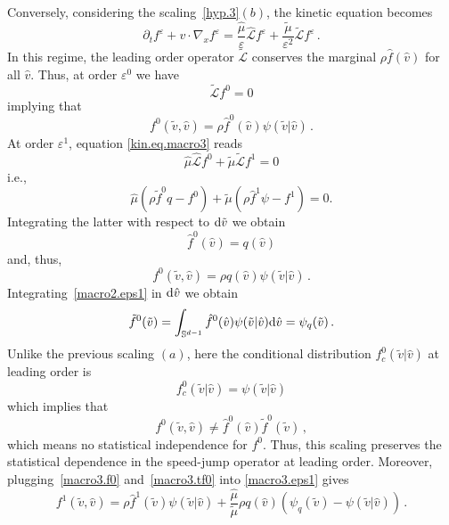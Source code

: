 \documentclass[a4paper]{article}
\theoremstyle{Theorem}\newtheorem{proposition}{Proposition}[section]
\theoremstyle{Remark}\newtheorem{remark}{Remark}[section]
\theoremstyle{Theorem}\newtheorem{theorem}{Theorem}[section]
\newcommand{\hv}{\hat{v}}
\newcommand{\tv}{\tilde{v}}
\newcommand{\hf}{\hat{f}}
\newcommand{\tf}{\tilde{f}}
\newcommand{\hmu}{\hat{\mu}}
\newcommand{\tmu}{\tilde{\mu}}
\newcommand{\intS}{\int_{\mathbb{S}^{d-1}}}
\begin{document}
Conversely, considering the scaling~\eqref{hyp.3}$(b)$, the kinetic equation becomes
\begin{equation}\label{kin.eq.macro3}
  \partial_t f^\varepsilon +v \cdot \nabla_x f^\varepsilon = \dfrac{\hmu}{\varepsilon}\hat{\mathcal{L}}f^\varepsilon +  \dfrac{\tmu}{\varepsilon^2}\tilde{\mathcal{L}} f^\varepsilon\,.
  \end{equation}
In this regime, the leading order operator $\tilde{\mathcal{L}}$ conserves the marginal $\rho \hf (\hv)$ for all $\hv$. Thus, at order $\varepsilon^0$ we have
\begin{equation*}
\tilde{\mathcal{L}}f^0=0    
\end{equation*}
implying that
\begin{equation*}
    f^0(\tv,\hv)=\rho \hf^0(\hv) \psi(\tv|\hv)\,.
\end{equation*}
At order $\varepsilon^1$, equation \eqref{kin.eq.macro3} reads
\begin{equation*}
\hmu\hat{\mathcal{L}}f^0 +  \tmu\tilde{\mathcal{L}}f^1=0    
\end{equation*}
i.e.,
\begin{equation}\label{macro3.eps1}
\hmu(\rho \tf^0 q-f^0)+\tmu (\rho \hf^1 \psi-f^1)=0.    
\end{equation}
Integrating the latter with respect to ${\rm d} \tv$ we obtain
\begin{equation*}\label{macro3.hf0}
    \hf^0(\hv)=q(\hv)
\end{equation*}
and, thus, 
\begin{equation}\label{macro3.f0}
     f^0(\tv,\hv)=\rho q(\hv) \psi(\tv|\hv)\,.
\end{equation}
Integrating~\eqref{macro2.eps1} in ${\rm d} \hv$ we obtain
\begin{equation}\label{macro3.tf0}
  \tf^0(\tv)=\intS \hf^0(\hv)\psi(\tv|\hv){\rm d}\hv=\psi_q(\tv)\,.
    \end{equation}
Unlike the previous scaling $(a)$, here the conditional distribution $f_c^0(\tv|\hv)$ at leading order is
\[
f_c^0(\tv|\hv)=\psi(\tv|\hv)
\]
which implies that 
$$
f^0(\tv,\hv)\ne\hf^0(\hv)\tf^0(\tv)\,,
$$
which means no statistical independence for $f^0$.
Thus, this scaling preserves the statistical dependence in the speed-jump operator at leading order. Moreover, plugging~\eqref{macro3.f0} and~\eqref{macro3.tf0} into \eqref{macro3.eps1} gives
\begin{equation*}
    f^1(\tv,\hv)=\rho \hf^1(\tv) \psi(\tv|\hv) +\dfrac{\hmu}{\tmu}\rho q(\hv) \left(\psi_q(\tv)-\psi(\tv|\hv)\right)\,.
\end{equation*}
\end{document}

